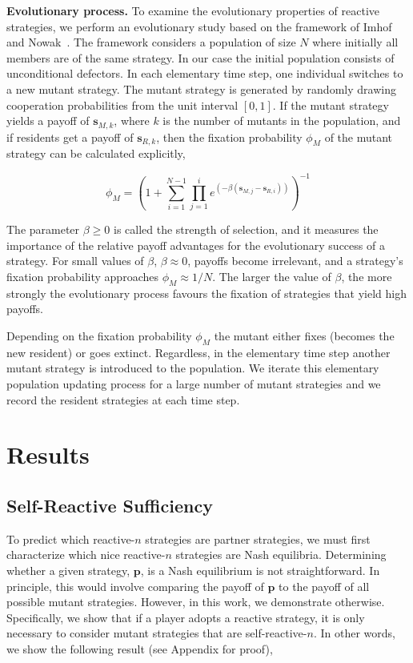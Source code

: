 \documentclass{article}
\theoremstyle{definition}
\begin{document}
\textbf{Evolutionary process.} To examine the evolutionary properties of
reactive strategies, we perform an evolutionary study based on the framework of
Imhof and Nowak~\citep{imhof:royal:2010}. The framework considers a population
of size \(N\) where initially all members are of the same strategy. In our case
the initial population consists of unconditional defectors. In each elementary
time step, one individual switches to a new mutant strategy. The mutant strategy
is generated by randomly drawing cooperation probabilities from the unit
interval \([0,1]\). If the mutant strategy yields a payoff of \(\mathbf{s}_{M, k}\),
where \(k\) is the number of mutants in the population, and if residents get a
payoff of \(\mathbf{s}_{R, k}\), then the fixation probability \(\phi_{M}\) of the
mutant strategy can be calculated explicitly,

\begin{equation}\label{eq:fixation_probability}
  \phi_{M} = \left(1 + \sum_{i=1}^{N - 1} \prod_{j=1}^{i} e^{(- \beta (\mathbf{s}_{M, j} - \mathbf{s}_{R, i}))} \right)^{-1}
\end{equation}

The parameter \(\beta \geq 0\) is called the strength of selection, and it
measures the importance of the relative payoff advantages for the
evolutionary success of a strategy. For small values of \(\beta\), \(\beta
\approx 0\), payoffs become irrelevant, and a strategy's fixation probability
approaches \(\phi_{M} \approx 1 / N\). The larger the value of \(\beta\), the
more strongly the evolutionary process favours the fixation of strategies that
yield high payoffs.

Depending on the fixation probability \(\phi_{M}\) the mutant either fixes
(becomes the new resident) or goes extinct. Regardless, in the elementary time
step another mutant strategy is introduced to the  population. We iterate this
elementary population updating process for a large number of mutant strategies
and we record the resident strategies at each time step.

\section{Results}

\subsection{Self-Reactive Sufficiency}

To predict which reactive-$n$ strategies are partner strategies, we must first
characterize which nice reactive-$n$ strategies are Nash equilibria. Determining
whether a given strategy, $\mathbf{p}$, is a Nash equilibrium is not
straightforward. In principle, this would involve comparing the payoff of
$\mathbf{p}$ to the payoff of all possible mutant strategies. However, in this
work, we demonstrate otherwise. Specifically, we show that if a player adopts a
reactive strategy, it is only necessary to consider mutant strategies that are
self-reactive-$n$. In other words, we show the following result (see Appendix for
proof),
\end{document}
